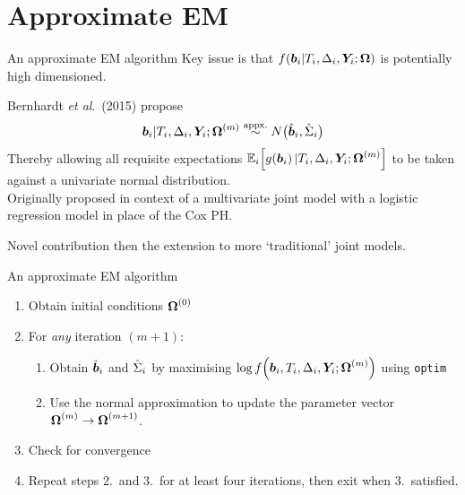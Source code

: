 \documentclass[10pt]{beamer}
\begin{document}
\section{Approximate EM}
\begin{frame}{An approximate EM algorithm}
Key issue is that $f\!\left(\bm{b}_i|T_i, \Delta_i, \bm{Y}_i; \bm{\mathrm{\Omega}}\right)$ is potentially high dimensioned.\\

\vspace{5mm}

Bernhardt \textit{et al}.\ (2015) \cite{Bernhardt15} propose
\begin{align*}
    \bm{b}_i|T_i,\Delta_i,\bm{Y}_i;\bm{\mathrm{\Omega}}^{(m)}\overset{\text{appx.}}{\sim} N\big(\hat{\bm{b}}_i,\hat{\Sigma}_i\big)
\end{align*}
Thereby allowing all requisite expectations $\operatorname{\mathbb{E}}_i\!\left[ g\!\left(\bm{b}_i\right)|T_i,\Delta_i,\bm{Y}_i;\bm{\mathrm{\Omega}}^{(m)}\right]$ to be taken against a univariate normal distribution.\\

\vspace{5mm}
Originally proposed in context of a multivariate joint model with a logistic regression model in place of the Cox PH.\\

\vspace{5mm}

Novel contribution then the extension to more `traditional' joint models.
\end{frame}

\begin{frame}{An approximate EM algorithm}

\begin{enumerate}
    \item Obtain initial conditions $\bm{\mathrm{\Omega}}^{(0)}$
    \vspace{2mm}
    \item For \textit{any} iteration $(m+1)$:
    \begin{enumerate}
        \item Obtain $\hat{\bm{b}}_i$ and $\hat{\Sigma}_i$ by maximising $\log f\!\left(\bm{b}_i,T_i,\Delta_i,\bm{Y}_i;\bm{\mathrm{\Omega}}^{(m)}\right)$ using \tt{optim}
        \item Use the normal approximation to update the parameter vector $\bm{\mathrm{\Omega}}^{(m)}\rightarrow\bm{\mathrm{\Omega}}^{(m+1)}$.
    \end{enumerate}
    \vspace{2mm}
    \item Check for convergence
    \vspace{2mm}
    \item Repeat steps 2.\ and 3.\ for at least four iterations, then exit when 3.\ satisfied.
\end{enumerate}
    
\end{frame}
\end{document}
